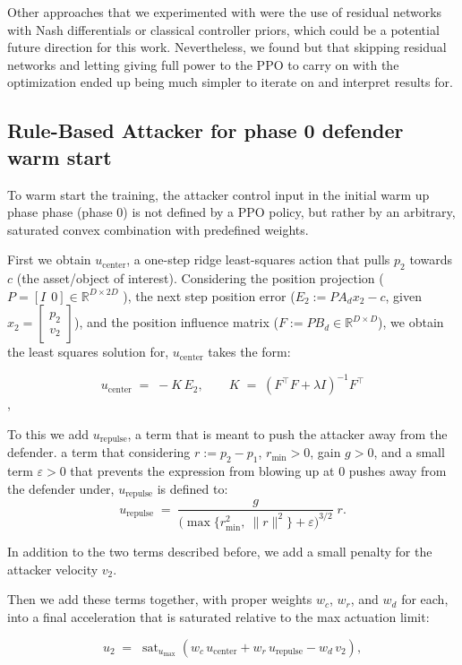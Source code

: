 Other approaches that we experimented with were the use of residual networks with Nash differentials or classical controller priors, which could be a potential future direction for this work. Nevertheless, we found but that skipping residual networks and letting giving full power to the PPO to carry on with the optimization ended up being much simpler to iterate on and interpret results for.

\subsection{Rule-Based Attacker for phase 0 defender warm start}
To warm start the training, the attacker control input in the initial warm up phase phase (phase 0) is not defined by a PPO policy, but rather by an arbitrary, saturated convex combination with predefined weights.

First we obtain $u_{\text{center}}$, a one-step ridge least-squares action that pulls \(p_2\) towards \(c\) (the asset/object of interest). Considering the position projection (\(P=[I\ \ 0]\in\mathbb{R}^{D\times 2D}\) ), the next step position error (\(E_2:= P A_d x_2 - c\), given \(x_2=\begin{bmatrix}p_2\\ v_2\end{bmatrix}\)), and the position influence matrix (\(F := P B_d \in\mathbb{R}^{D\times D}\)), we obtain the least squares solution for, $u_{\text{center}}$ takes the form: 

\[
u_{\text{center}} \;=\; - K\,E_2,\qquad
K \;=\; (F^\top F + \lambda I)^{-1} F^\top
\],

To this we add \(u_{\text{repulse}}\), a term that is meant to push the attacker away from the defender. a term that considering \(r := p_2-p_1\), \(r_{\min}>0\), gain \(g>0\), and a small term \(\varepsilon > 0\) that prevents the expression from blowing up at 0 pushes away from the defender under, \(u_{\text{repulse}}\) is defined to: 
\[
u_{\text{repulse}} \;=\; \frac{g}{\big(\max\{r_{\min}^2,\ \|r\|^2\}+\varepsilon\big)^{3/2}}\; r.
\]

In addition to the two terms described before, we add a small penalty for the attacker velocity $v_2$.


Then we add these terms together, with proper weights $w_c$, $w_r$, and $w_d$ for each, into a final acceleration that is saturated relative to the max actuation limit:


\[
\boxed{
u_2 \;=\; \operatorname{sat}_{u_{\max}}\!\left(
w_c\,u_{\text{center}} + w_r\,u_{\text{repulse}} - w_d\,v_2\right)},
\]












